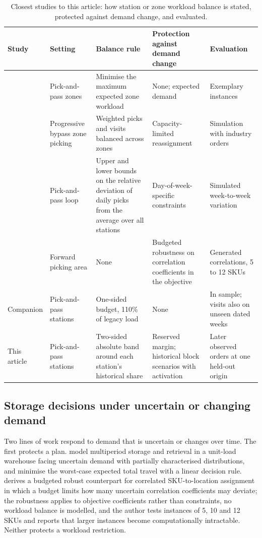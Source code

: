 \begin{table}[htbp]
\centering
\caption{Closest studies to this article: how station or zone workload balance is stated, protected against demand change, and evaluated.}
\label{tab:closest}
\footnotesize
\setlength{\tabcolsep}{3pt}
\begin{tabular}{@{}p{2.2cm}p{2.3cm}p{2.7cm}p{2.6cm}p{2.5cm}@{}}
\toprule
Study & Setting & Balance rule & Protection against demand change & Evaluation \\
\midrule
\citet{tarczynski2023} & Pick-and-pass zones & Minimise the maximum expected zone workload & None; expected demand & Exemplary instances \\
\citet{kim2022dynamic} & Progressive bypass zone picking & Weighted picks and visits balanced across zones & Capacity-limited reassignment & Simulation with industry orders \\
\citet{winkelmann2025integrated} & Pick-and-pass loop & Upper and lower bounds on the relative deviation of daily picks from the average over all stations & Day-of-week-specific constraints & Simulated week-to-week variation \\
\citet{dundar2025robust} & Forward picking area & None & Budgeted robustness on correlation coefficients in the objective & Generated correlations, 5 to 12 SKUs \\
Companion \citep{belul_companion} & Pick-and-pass stations & One-sided budget, 110\% of legacy load & None & In sample; visits also on unseen dated weeks \\
This article & Pick-and-pass stations & Two-sided absolute band around each station's historical share & Reserved margin; historical block scenarios with activation & Later observed orders at one held-out origin \\
\bottomrule
\end{tabular}
\end{table}

\subsection{Storage decisions under uncertain or changing demand}\label{subsec:rw_uncertain}
Two lines of work respond to demand that is uncertain or changes over time. The first protects a plan. \citet{ang2012robust} model multiperiod storage and retrieval in a unit-load warehouse facing uncertain demand with partially characterised distributions, and minimise the worst-case expected total travel with a linear decision rule. \citet{dundar2025robust} derives a budgeted robust counterpart for correlated SKU-to-location assignment in which a budget limits how many uncertain correlation coefficients may deviate; the robustness applies to objective coefficients rather than constraints, no workload balance is modelled, and the author tests instances of 5, 10 and 12 SKUs and reports that larger instances become computationally intractable. Neither protects a workload restriction.

